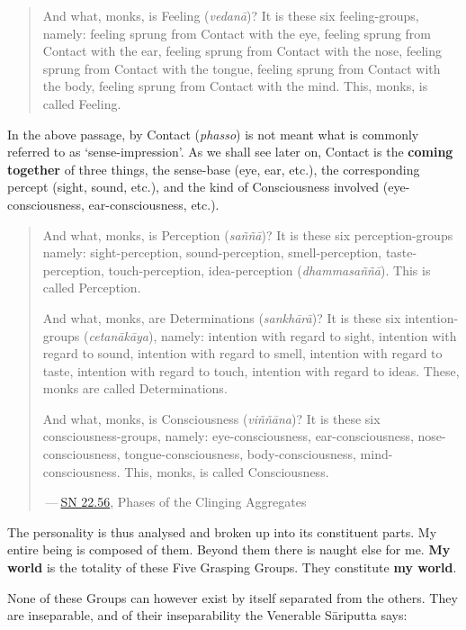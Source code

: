 \begin{quote}
And what, monks, is Feeling (\emph{vedanā})? It is these six feeling-groups, namely: feeling sprung from Contact with the eye, feeling sprung from Contact with the ear, feeling sprung from Contact with the nose, feeling sprung from Contact with the tongue, feeling sprung from Contact with the body, feeling sprung from Contact with the mind. This, monks, is called Feeling.
\end{quote}

In the above passage, by Contact (\emph{phasso}) is not meant what is commonly referred to as `sense-impression'. As we shall see later on, Contact is the \textbf{coming together} of three things, the sense-base (eye, ear, etc.), the corresponding percept (sight, sound, etc.), and the kind of Consciousness involved (eye-consciousness, ear-consciousness, etc.).

\begin{quote}
And what, monks, is Perception (\emph{saññā})? It is these six perception-groups namely: sight-perception, sound-perception, smell-perception, taste-perception, touch-perception, idea-perception (\emph{dhammasaññā}). This is called Perception.

And what, monks, are Determinations (\emph{sankhārā})? It is these six intention-groups (\emph{cetanākāya}), namely: intention with regard to sight, intention with regard to sound, intention with regard to smell, intention with regard to taste, intention with regard to touch, intention with regard to ideas. These, monks are called Determinations.

And what, monks, is Consciousness (\emph{viññāna})? It is these six consciousness-groups, namely: eye-consciousness, ear-consciousness, nose-consciousness, tongue-consciousness, body-consciousness, mind-consciousness. This, monks, is called Consciousness.

 --- \href{https://suttacentral.net/sn22.56/en/bodhi}{SN 22.56}, Phases of the Clinging Aggregates
\end{quote}

The personality is thus analysed and broken up into its constituent parts. My entire being is composed of them. Beyond them there is naught else for me. \textbf{My world} is the totality of these Five Grasping Groups. They constitute \textbf{my world}.

None of these Groups can however exist by itself separated from the others. They are inseparable, and of their inseparability the Venerable Sāriputta says:

